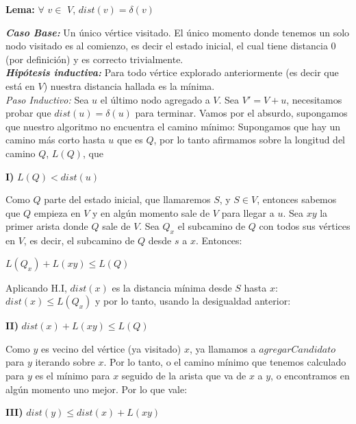 \begin{center}
\textbf{Lema: } $\forall$ $v \in$ $V$, $dist(v) = \delta(v)$
\end{center}

\emph{\textbf{Caso Base: }}  Un único vértice visitado. El único momento donde tenemos un solo nodo visitado es al comienzo, es decir
el estado inicial, el cual tiene distancia 0 (por definición) y es correcto trivialmente.
\\

\emph{\textbf{Hipótesis inductiva: }} Para todo vértice explorado anteriormente (es decir que está en $V$) nuestra distancia hallada es la mínima.
\\

\emph{Paso Inductivo:} Sea $u$ el último nodo agregado a $V$. Sea $V'= V + u$, necesitamos probar que $dist(u) = \delta(u)$ para terminar. Vamos por el absurdo, supongamos que nuestro algoritmo no encuentra el camino mínimo: Supongamos que hay un camino más corto hasta $u$ que es $Q$, por lo tanto afirmamos sobre la longitud del camino $Q$, $L(Q)$, que
\\
\begin{center}
\textbf{I)} $L(Q) < dist(u)$
\\
\end{center}
Como $Q$ parte del estado inicial, que llamaremos $S$, y $S \in V$, entonces sabemos que $Q$ empieza en $V$ y en algún momento sale de $V$ para llegar a $u$. Sea $xy$ la primer arista donde $Q$ sale de $V$. Sea $Q_x$ el subcamino de $Q$ con todos sus vértices en $V$, es decir, el subcamino de $Q$ desde $s$ a $x$. Entonces:
\\
\begin{center}
$L(Q_x)+L(xy) \leq L(Q)$
\\
\end{center}
Aplicando H.I, $dist(x)$ es la distancia mínima desde $S$ hasta $x$: $dist(x) \leq L(Q_x)$ y por lo tanto, usando la desigualdad anterior:
\\
\begin{center}
\textbf{II)} $dist(x)+L(xy) \leq L(Q) $
\\
\end{center}
Como $y$ es vecino del vértice (ya visitado) $x$, ya llamamos a $agregarCandidato$ para $y$ iterando sobre $x$. Por lo tanto, o el camino mínimo que tenemos calculado para $y$ es el mínimo para $x$ seguido de la arista que va de $x$ a $y$, o encontramos en algún momento uno mejor. Por lo que vale:
\\
\begin{center}
\textbf{III)} $dist(y) \leq dist(x) + L(xy)$
\\
\end{center}
